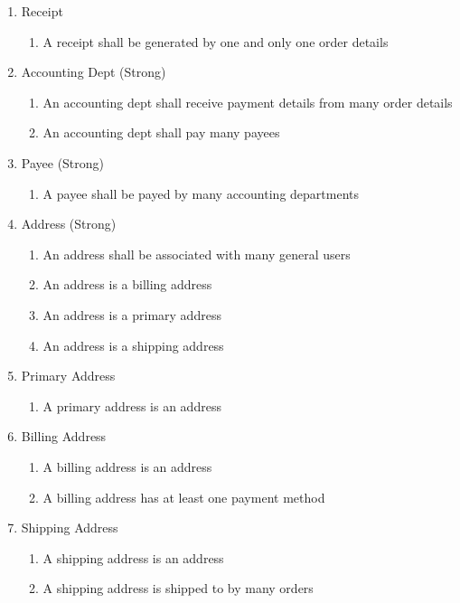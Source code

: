 \documentclass{article}
\begin{document}
\begin{enumerate}
\item Receipt
\begin{enumerate}
	\item A receipt shall be generated by one and only one order details
\end{enumerate}
	
\item Accounting Dept (Strong)
\begin{enumerate}
	\item An accounting dept shall receive payment details from many order details
	\item An accounting dept shall pay many payees
\end{enumerate}

\item Payee (Strong)
\begin{enumerate}
	\item A payee shall be payed by many accounting departments
\end{enumerate}
	
\item Address (Strong)
\begin{enumerate}
	\item An address shall be associated with many general users
	\item An address is a billing address
	\item An address is a primary address
	\item An address is a shipping address
\end{enumerate}
	
\item Primary Address
\begin{enumerate}
	\item A primary address is an address
\end{enumerate}
	
\item Billing Address
\begin{enumerate}
	\item A billing address is an address
	\item A billing address has at least one payment method
\end{enumerate}
	
\item Shipping Address
\begin{enumerate}
	\item A shipping address is an address
	\item A shipping address is shipped to by many orders
\end{enumerate}


\end{enumerate}
\end{document}
